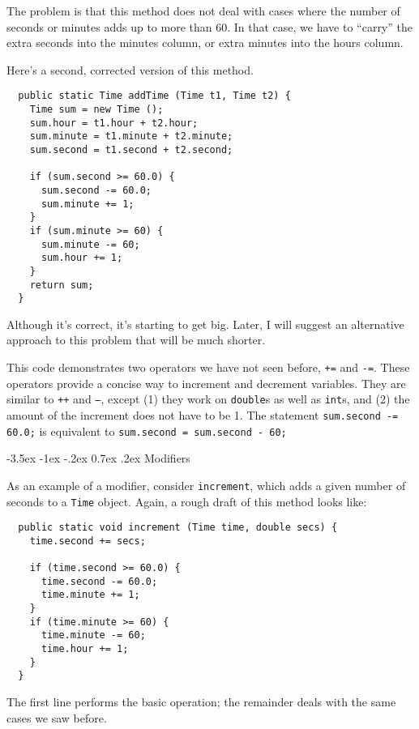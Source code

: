 \documentclass{book}
\makeatletter
\renewcommand{\section}{\@startsection 
    {section} {1} {0mm}%
    {-3.5ex \@plus -1ex \@minus -.2ex}%
    {0.7ex \@plus.2ex}%
    {\normalfont\Large\bfseries}}
\makeatother
\begin{document}
The problem is that this method does not deal with cases
where the number of seconds or minutes adds up to more than
60.  In that case, we have to ``carry'' the extra seconds
into the minutes column, or extra minutes into the hours
column.

Here's a second, corrected version of this method.

\begin{verbatim}
  public static Time addTime (Time t1, Time t2) {
    Time sum = new Time ();
    sum.hour = t1.hour + t2.hour;
    sum.minute = t1.minute + t2.minute;
    sum.second = t1.second + t2.second;

    if (sum.second >= 60.0) {
      sum.second -= 60.0;
      sum.minute += 1;
    }
    if (sum.minute >= 60) {
      sum.minute -= 60;
      sum.hour += 1;
    }
    return sum;
  }
\end{verbatim}
%
Although it's correct, it's starting to get big.  Later,
I will suggest an alternative approach to this problem that
will be much shorter.


This code demonstrates two operators we have not seen before,
{\tt +=} and {\tt -=}.  These operators provide a concise
way to increment and decrement variables.  They are similar
to {\tt ++} and {\tt --}, except (1) they work on {\tt double}s
as well as {\tt int}s, and (2) the amount of the increment
does not have to be 1.  The statement {\tt sum.second -= 60.0;}
is equivalent to {\tt sum.second = sum.second - 60;}

\section{Modifiers}

As an example of a modifier, consider {\tt increment},
which adds a given number of seconds to a {\tt Time} object.
Again, a rough draft of this method looks like:

\begin{verbatim}
  public static void increment (Time time, double secs) {
    time.second += secs;

    if (time.second >= 60.0) {
      time.second -= 60.0;
      time.minute += 1;
    }
    if (time.minute >= 60) {
      time.minute -= 60;
      time.hour += 1;
    }
  }
\end{verbatim}
%
The first line performs the basic operation; the remainder
deals with the same cases we saw before.
\end{document}
